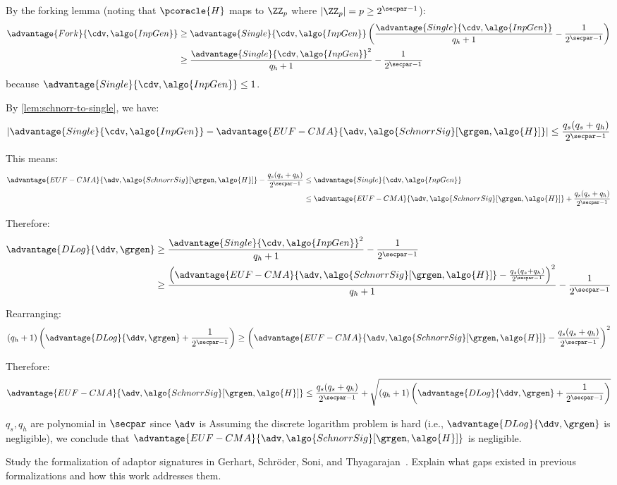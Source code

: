 \begin{mysolution}
  By the forking lemma (noting that $\pcoracle{H}$ maps to $\ZZ_p$ where $|\ZZ_p| = p \geq 2^{\secpar-1}$):
  \begin{align*}
    \advantage{Fork}{\cdv, \algo{InpGen}} &\geq \advantage{Single}{\cdv, \algo{InpGen}} \left( \frac{\advantage{Single}{\cdv, \algo{InpGen}}}{q_h + 1} - \frac{1}{2^{\secpar-1}} \right)\\
    &\geq  \frac{\advantage{Single}{\cdv, \algo{InpGen}}^2}{q_h + 1} - \frac{1}{2^{\secpar-1}}\\
  \end{align*}
  because $\advantage{Single}{\cdv, \algo{InpGen}} \leq 1$.
  
  By \autoref{lem:schnorr-to-single}, we have:
  \[
    \left|\advantage{Single}{\cdv, \algo{InpGen}} - \advantage{EUF-CMA}{\adv, \algo{SchnorrSig}[\grgen, \algo{H}]}\right| \leq \frac{q_s(q_s + q_h)}{2^{\secpar-1}}
  \]
  
  This means:
  \begin{align*}
    \advantage{EUF-CMA}{\adv, \algo{SchnorrSig}[\grgen, \algo{H}]} - \frac{q_s(q_s + q_h)}{2^{\secpar-1}} &\leq \advantage{Single}{\cdv, \algo{InpGen}}\\
    &\leq \advantage{EUF-CMA}{\adv, \algo{SchnorrSig}[\grgen, \algo{H}]} + \frac{q_s(q_s + q_h)}{2^{\secpar-1}}
  \end{align*}
  
  Therefore:
  \begin{align*}
    \advantage{DLog}{\ddv, \grgen} &\geq \frac{\advantage{Single}{\cdv, \algo{InpGen}}^2}{q_h + 1} - \frac{1}{2^{\secpar-1}}\\
    &\geq \frac{\left(\advantage{EUF-CMA}{\adv, \algo{SchnorrSig}[\grgen, \algo{H}]} - \frac{q_s(q_s + q_h)}{2^{\secpar-1}}\right)^2}{q_h + 1} - \frac{1}{2^{\secpar-1}}
  \end{align*}
  
  Rearranging:
  \[
    (q_h + 1) \left(\advantage{DLog}{\ddv, \grgen} + \frac{1}{2^{\secpar-1}}\right) \geq \left(\advantage{EUF-CMA}{\adv, \algo{SchnorrSig}[\grgen, \algo{H}]} - \frac{q_s(q_s + q_h)}{2^{\secpar-1}}\right)^2
  \]
  
  Therefore:
  \[
    \advantage{EUF-CMA}{\adv, \algo{SchnorrSig}[\grgen, \algo{H}]} \leq \frac{q_s(q_s + q_h)}{2^{\secpar-1}} + \sqrt{(q_h + 1) \left(\advantage{DLog}{\ddv, \grgen} + \frac{1}{2^{\secpar-1}}\right)}
  \]
  
  $q_s, q_h$ are polynomial in $\secpar$ since $\adv$ is \ppt
  Assuming the discrete logarithm problem is hard (i.e., $\advantage{DLog}{\ddv, \grgen}$ is negligible), we conclude that $\advantage{EUF-CMA}{\adv, \algo{SchnorrSig}[\grgen, \algo{H}]}$ is negligible.
\end{mysolution}
\fi

\begin{exercise}[Optional]
  Study the formalization of adaptor signatures in Gerhart, Schröder, Soni, and Thyagarajan~\cite{EC:GSST24}.
  Explain what gaps existed in previous formalizations and how this work addresses them.
\end{exercise}
